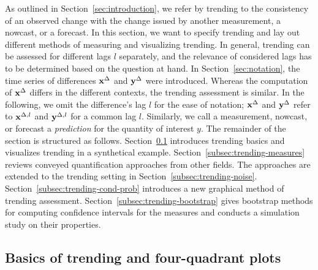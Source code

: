 
As outlined in Section~\ref{sec:introduction}, we refer by trending to the consistency of an observed change with the change issued by another measurement, a nowcast, or a forecast.
In this section, we want to specify trending and lay out different methods of measuring and visualizing trending. 
In general, trending can be assessed for different lags $l$ separately, and the relevance of considered lags has to be determined based on the question at hand.
In Section~\ref{sec:notation}, the time series of differences $\mathbf{x}^{\Delta}$ and $\mathbf{y}^{\Delta}$ were introduced.
Whereas the computation of $\mathbf{x}^{\Delta}$ differs in the different contexts, the trending assessment is similar.
In the following, we omit the difference's lag $l$ for the ease of notation; $\mathbf{x}^{\Delta}$ and $\mathbf{y}^{\Delta}$ refer to $\mathbf{x}^{\Delta,l}$ and $\mathbf{y}^{\Delta,l}$ for a common lag $l$.
Similarly, we call a measurement, nowcast, or forecast a \textit{prediction} for the quantity of interest $y$. 
The remainder of the section is structured as follows.
Section~\ref{subsec:trending-basics} introduces trending basics and visualizes trending in a synthetical example.
Section~\ref{subsec:trending-measures} reviews conveyed quantification approaches from other fields.
The approaches are extended to the trending setting in Section~\ref{subsec:trending-noise}.
Section~\ref{subsec:trending-cond-prob} introduces a new graphical method of trending assessment.
Section~\ref{subsec:trending-bootstrap} gives bootstrap methods for computing confidence intervals for the measures and conducts a simulation study on their properties.


\subsection{Basics of trending and four-quadrant plots}\label{subsec:trending-basics}

